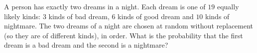 A person has exactly two dreams in a night. Each dream is one of $19$ equally likely kinds: $3$ kinds of bad dream, $6$ kinds of good dream and $10$ kinds of nightmare. The two dreams of a night are chosen at random without replacement (so they are of different kinds), in order. What is the probability that the first dream is a bad dream and the second is a nightmare?
